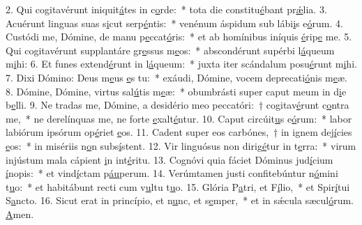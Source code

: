 2. Qui cogitavérunt iniquit\uline{á}tes in c\uline{o}rde:~* tota die constitu\uline{é}bant pr\uline{ǽ}lia.
3. Acuérunt linguas suas s\uline{i}cut serp\uline{é}ntis:~* venénum áspidum sub lábi\uline{i}s e\uline{ó}rum.
4. Custódi me, Dómine, de manu p\uline{e}ccat\uline{ó}ris:~* et ab homínibus iníquis \uline{é}rip\uline{e} me.
5. Qui cogitavérunt supplantáre gr\uline{e}ssus m\uline{e}os:~* abscondérunt supérbi l\uline{á}queum m\uline{i}hi:
6. Et funes extend\uline{é}runt in l\uline{á}queum:~* juxta iter scándalum posu\uline{é}runt m\uline{i}hi.
7. Dixi Dómino: Deus m\uline{e}us \uline{e}s tu:~* exáudi, Dómine, vocem deprecati\uline{ó}nis m\uline{e}æ.
8. Dómine, Dómine, virtus sal\uline{ú}tis m\uline{e}æ:~* obumbrásti super caput meum in d\uline{i}e b\uline{e}lli.
9. Ne tradas me, Dómine, a desidério meo peccatóri:~† cogitav\uline{é}runt c\uline{o}ntra me,~* ne derelínquas me, ne forte \uline{e}xalt\uline{é}ntur.
10. Caput circúit\uline{u}s e\uline{ó}rum:~* labor labiórum ipsórum op\uline{é}riet \uline{e}os.
11. Cadent super eos carbónes,~† in ignem dej\uline{í}cies \uline{e}os:~* in misériis n\uline{o}n subs\uline{í}stent.
12. Vir linguósus non dirig\uline{é}tur in t\uline{e}rra:~* virum injústum mala cápient \uline{i}n int\uline{é}ritu.
13. Cognóvi quia fáciet Dóminus jud\uline{í}cium \uline{í}nopis:~* et vind\uline{í}ctam p\uline{áu}perum.
14. Verúmtamen justi confitebúntur n\uline{ó}mini t\uline{u}o:~* et habitábunt recti cum v\uline{u}ltu t\uline{u}o.
15. Glória P\uline{a}tri, et F\uline{í}lio,~* et Spir\uline{í}tui S\uline{a}ncto.
16. Sicut erat in princípio, et n\uline{u}nc, et s\uline{e}mper,~* et in sǽcula sæcul\uline{ó}rum. \uline{A}men.
